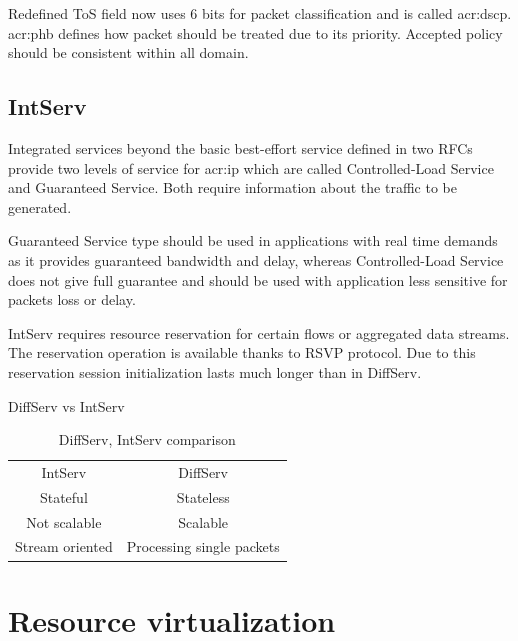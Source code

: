 \documentclass[11pt]{book}
\begin{document}
        \medskip

        Redefined ToS field now uses 6 bits for packet classification and is called \gls{acr:dscp}. \gls{acr:phb}
        defines how packet should be treated due to its priority. Accepted policy should be consistent within all
        domain.


      \subsection{IntServ}

        Integrated services beyond the basic best-effort service defined in two RFCs provide two levels of service for
        \gls{acr:ip} which are called Controlled-Load Service and Guaranteed Service. Both require information about the
        traffic to be generated. 

        Guaranteed Service type should be used in applications with real time demands as it provides guaranteed
        bandwidth and delay, whereas Controlled-Load Service does not give full guarantee and should be used with
        application less sensitive for packets loss or delay.

        IntServ requires resource reservation for certain flows or aggregated data streams. The reservation operation is
        available thanks to RSVP protocol. Due to this reservation session initialization lasts much longer than in
        DiffServ.

        {DiffServ vs IntServ}

        \begin{table}[ht]
          \caption{DiffServ, IntServ comparison}
          \centering %
          \begin{tabular}{c c}
            \hline \hline
            IntServ         & DiffServ \\
            Stateful        & Stateless \\
            Not scalable    & Scalable \\
            Stream oriented & Processing single packets \\
            \hline
          \end{tabular}
        \end{table}


    \section{Resource virtualization}
\end{document}
